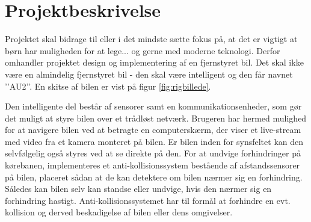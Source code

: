 
\section{Projektbeskrivelse} \label{sec:beskrivelse}


Projektet skal bidrage til eller i det mindste sætte fokus på, at det er vigtigt at børn har muligheden for at lege... og gerne med moderne teknologi. Derfor omhandler projektet design og implementering af en fjernstyret bil. Det skal ikke være en almindelig fjernstyret bil - den skal være intelligent og den får navnet ’’AU2’’. En skitse af bilen er vist på figur \ref{fig:rigbillede}.

Den intelligente del består af sensorer samt en kommunikationsenheder, som gør det muligt at styre bilen over et trådløst netværk. Brugeren har hermed mulighed for at navigere bilen ved at betragte en computerskærm, der viser et live-stream med video fra et kamera monteret på bilen. Er bilen inden for synsfeltet kan den selvfølgelig også styres ved at se direkte på den. For at undvige forhindringer på kørebanen, implementeres et anti-kollisionssystem bestående af afstandssensorer på bilen, placeret sådan at de kan detektere om bilen nærmer sig en forhindring. Således kan bilen selv kan standse eller undvige, hvis den nærmer sig en forhindring hastigt. Anti-kollisionssystemet har til formål at  forhindre en evt. kollision og derved beskadigelse af bilen eller dens omgivelser.

